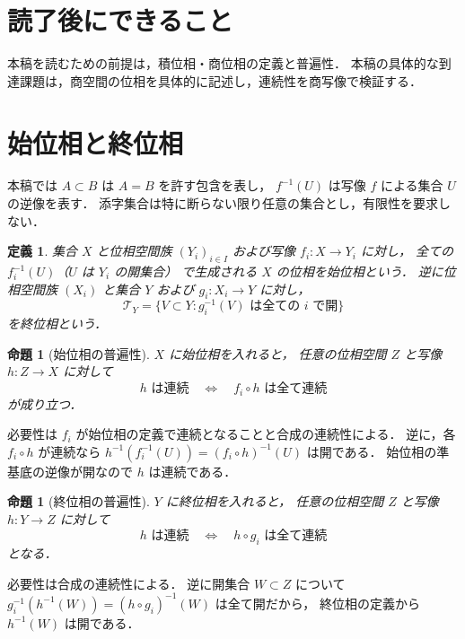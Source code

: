 \documentclass[a5paper,10pt,onecolumn]{jsarticle}
\makeatletter
\theoremstyle{mathnotetheorem}
\newtheorem{definition}[theorem]{定義}
\newtheorem{proposition}[theorem]{命題}
\renewcommand{\proofname}{証明}
\renewenvironment{proof}[1][\proofname]{%
  \par\pushQED{\qed}\normalfont\topsep4\p@\@plus2\p@\relax
  \trivlist\item[\hskip\labelsep\bfseries #1]\ignorespaces
}{\popQED\endtrivlist\@endpefalse}
\makeatother
\begin{document}
\section*{読了後にできること}
本稿を読むための前提は，積位相・商位相の定義と普遍性．
本稿の具体的な到達課題は，商空間の位相を具体的に記述し，連続性を商写像で検証する．


\section{始位相と終位相}
本稿では $A\subset B$ は $A=B$ を許す包含を表し，
$f^{-1}(U)$ は写像 $f$ による集合 $U$ の逆像を表す．
添字集合は特に断らない限り任意の集合とし，有限性を要求しない．
\begin{definition}
集合 $X$ と位相空間族 $(Y_i)_{i\in I}$ および写像
$f_i:X\to Y_i$ に対し，
全ての $f_i^{-1}(U)$（$U$ は $Y_i$ の開集合）
で生成される $X$ の位相を始位相という．
逆に位相空間族 $(X_i)$ と集合 $Y$ および
$g_i:X_i\to Y$ に対し，
\[
 \mathcal T_Y=\{V\subset Y:g_i^{-1}(V)\text{ は全ての }i
 \text{ で開}\}
\]
を終位相という．
\end{definition}
\begin{proposition}[始位相の普遍性]\label{prop:initial}
$X$ に始位相を入れると，
任意の位相空間 $Z$ と写像 $h:Z\to X$ に対して
\[
 h\text{ は連続}\quad\Longleftrightarrow\quad
 f_i\circ h\text{ は全て連続}
\]
が成り立つ．
\end{proposition}
\begin{proof}
必要性は $f_i$ が始位相の定義で連続となることと合成の連続性による．
逆に，各 $f_i\circ h$ が連続なら
$h^{-1}(f_i^{-1}(U))=(f_i\circ h)^{-1}(U)$ は開である．
始位相の準基底の逆像が開なので $h$ は連続である．
\end{proof}
\begin{proposition}[終位相の普遍性]\label{prop:final}
$Y$ に終位相を入れると，
任意の位相空間 $Z$ と写像 $h:Y\to Z$ に対して
\[
 h\text{ は連続}\quad\Longleftrightarrow\quad
 h\circ g_i\text{ は全て連続}
\]
となる．
\end{proposition}
\begin{proof}
必要性は合成の連続性による．
逆に開集合 $W\subset Z$ について
$g_i^{-1}(h^{-1}(W))=(h\circ g_i)^{-1}(W)$ は全て開だから，
終位相の定義から $h^{-1}(W)$ は開である．
\end{proof}
\end{document}
